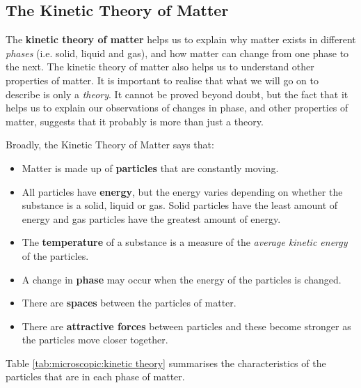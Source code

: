             \subsection{ The Kinetic Theory of Matter}
            \nopagebreak
      \label{m38730*id308618}The \textbf{kinetic theory of 
matter} helps us to explain why matter exists in different \textsl{phases} (i.e. solid, liquid and gas), and how matter 
can change from one phase to the next. The kinetic theory of matter also helps 
us to understand other properties of matter. It is important to realise that 
what we will go on to describe is only a \textsl{theory}. It cannot be proved beyond doubt, but the 
fact that it helps us to explain our observations of changes in phase, and other 
properties of matter, suggests that it probably is more than just a theory.
\par 
      \label{m38730*id308641}Broadly, the Kinetic Theory of Matter says that:
\par 
      \label{m38730*id308647}\begin{itemize}[noitemsep]
            \label{m38730*uid34}\item Matter is made up of \textbf{particles} 
that are constantly moving.
\label{m38730*uid35}\item All particles have \textbf{energy}, but the energy varies depending on whether the 
substance is a solid, liquid or gas. Solid particles have the least amount of 
energy and gas particles have the greatest amount of energy.
\label{m38730*uid36}\item The \textbf{temperature} of a 
substance is a measure of the \textsl{average kinetic 
energy} of the particles.
\label{m38730*uid37}\item A change in \textbf{phase} 
may occur when the energy of the particles is changed.
\label{m38730*uid38}\item There are \textbf{spaces} 
between the particles of matter.
\label{m38730*uid39}\item There are \textbf{attractive 
forces} between particles and these become stronger as the particles 
move closer together.
\end{itemize}
      \label{m38730*id308767}Table \ref{tab:microscopic:kinetic theory} summarises the 
characteristics of the particles that are in each phase of matter.\par 
